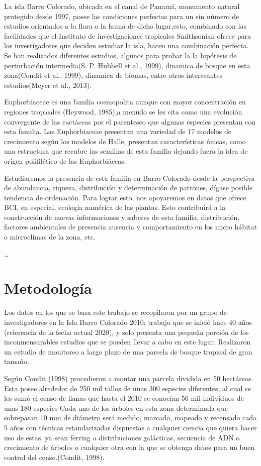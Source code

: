 \documentclass[11pt,]{article}
\begin{document}
La isla Barro Colorado, ubicada en el canal de Panamá, monumento natural
protegido desde 1997, posee las condiciones perfectas para un sin número
de estudios orientados a la flora o la fauna de dicho lugar,esto,
combinado con las facilidades que el Instituto de investigaciones
tropicales Smithsonian ofrece para los investigadores que deciden
estudiar la isla, hacen una combinación perfecta. Se han realizados
diferentes estudios, algunos para probar la la hipótesis de perturbación
intermedia(S. P. Hubbell et al., 1999), dinamica de bosque en esta
zona(Condit et al., 1999), dinamica de biomas, entre otros interesantes
estudios(Meyer et al., 2013).

Euphorbiaceae es una familia cosmopolita aunque con mayor concentración
en regiones tropicales (Heywood, 1985),a menudo se les cita como una
evolución convergente de las cactáceas por el parentesco que algunas
especies presentan con esta familia. Las Euphorbiaceae presentan una
variedad de 17 modelos de crecimiento según los modelos de Halle,
presentan características únicas, como una estructura que recubre las
semillas de esta familia dejando fuera la idea de origen polifilético de
las Euphorbiáceas.

Estudiaremos la presencia de esta familia en Barro Colorado desde la
perspectiva de abundancia, riqueza, distribución y determinación de
patrones, dígase posible tendencia de ordenación. Para lograr esto, nos
apoyaremos en datos que ofrece BCI, en especial, ecología numérica de
las plantas. Esto contribuirá a la construcción de nuevas informaciones
y saberes de esta familia, distribución, factores ambientales de
presencia ausencia y comportamiento en los micro hábitat o microclimas
de la zona, etc.

\ldots

\section{Metodología}\label{metodologuxeda}

Los datos en los que se basa este trabajo se recopilaron por un grupo de
investigadores en la Isla Barro Colorado 2010; trabajo que se inició
hace 40 años (referencia de la fecha actual 2020), y solo presenta una
pequeña porción de los inconmensurables estudios que se pueden llevar a
cabo en este lugar. Realizaron un estudio de monitoreo a largo plazo de
una parcela de bosque tropical de gran tamaño.

Según Condit (1998) procedieron a montar una parcela dividida en 50
hectáreas. Esta posee alrededor de 250 mil tallos de unas 300 especies
diferentes, al cual se les sumó el censo de lianas que hasta el 2010 se
conocían 56 mil individuos de unas 180 especies Cada uno de los árboles
en esta zona determinada que sobrepasan 10 mm de diámetro será medido,
marcado, mapeado y recensado cada 5 años con técnicas estandarizadas
dispuestas a cualquier ciencia que quiera hacer uso de estas, ya sean
ferring a distribuciones galácticas, secuencia de ADN o crecimiento de
árboles o cualquier otra con la que se obtenga datos para un buen
control del censo.(Condit, 1998).
\end{document}
